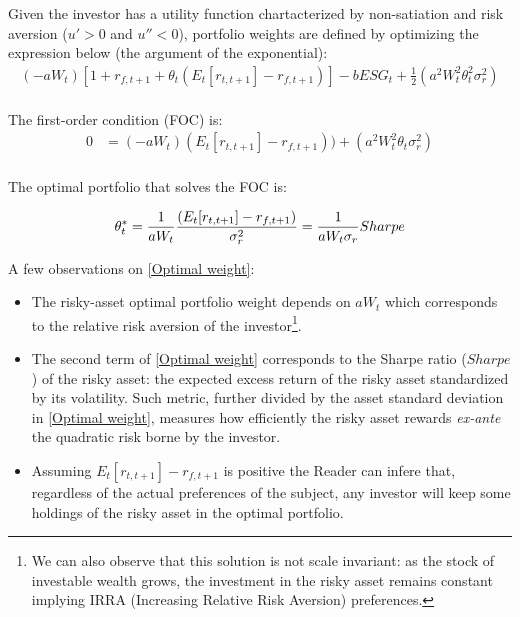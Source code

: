 \documentclass[12pt]{article}
\begin{document}
	Given the investor has a utility function chartacterized by non-satiation and risk aversion ($u'>0$ and $u''<0$), portfolio weights are defined by optimizing the expression below (the argument of the exponential): \vspace{-3em}\\
	
	\begin{align*}
		(-aW_t) [1 + r_{f,t+1} + \theta_t(E_{t}[r_{t,t+1}]-r_{f, t+1})] - bESG_t + \frac{1}{2}(a^2W_t^2\theta_t^2\sigma_r^2) \\
	\end{align*} \vspace{-3em}
	
	The first-order condition (FOC) is: \vspace{-2.5em}\\
	
	\begin{align*}
		0 &= (-aW_t)(E_{t}[r_{t,t+1}]-r_{f, t+1})) + (a^2W_t^2\theta_t\sigma_r^2) \\
	\end{align*} \vspace{-3em}
	
	The optimal portfolio that solves the FOC is: 
	
	\begin{equation} \label{Optimal weight}
		\theta_t^* = \frac{1}{aW_t}\frac{(E_{t}[r_{t,t+1}]-r_{f, t+1})}{\sigma_r^2} = \frac{1}{aW_t\sigma_r}Sharpe\\
	\end{equation}
	
	A few observations on \ref{Optimal weight}:
	\begin{itemize}
		\item The risky-asset optimal portfolio weight depends on $aW_t$ which corresponds to the relative risk aversion of the investor\footnote {We can also observe that this solution is not scale invariant: as the stock of investable wealth grows, the investment in the risky asset remains constant implying IRRA (Increasing Relative Risk Aversion) preferences.}.
		\item The second term of \ref{Optimal weight} corresponds to the Sharpe ratio ($Sharpe$) of the risky asset: the expected excess return of the risky asset standardized by its volatility. Such metric, further divided by the asset standard deviation in \ref{Optimal weight}, measures how efficiently the risky asset rewards \textit{ex-ante} the quadratic risk borne by the investor.
		\item Assuming $E_{t}[r_{t,t+1}] - r_{f, t+1}$ is positive the Reader can infere that, regardless of the actual preferences of the subject, any investor will keep some holdings of the risky asset in the optimal portfolio.\\ \vspace{-1.5em}    
	\end{itemize}
	
\end{document}
